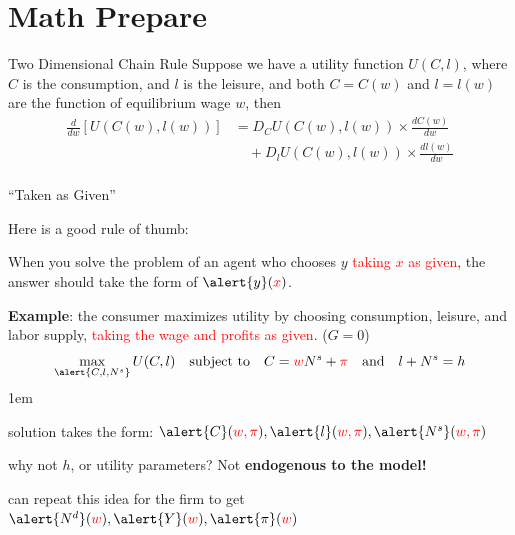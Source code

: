 \documentclass[11pt,aspectratio=43]{beamer}
\newcommand{\red}[1]{\textcolor{red}{#1}}
\let\olditemize=\itemize
\let\endolditemize=\enditemize
\renewenvironment{itemize}{\olditemize \itemsep1em}{\endolditemize}
\theoremstyle{definition}
\begin{document}
\section{Math Prepare}
\label{sec:Math_Prepare}

\begin{frame}{Two Dimensional Chain Rule}
\label{slide:Two_Dimensional_Chain_Rule}
    Suppose we have a utility function $ U( C, l ) $, where $ C $ is the consumption, and $ l $ is the leisure, and both $ C = C( w ) $ and $ l = l( w ) $ are the function of equilibrium wage $ w $, then
    \begin{equation}
    \label{eq:chain_rule}
        \begin{split}
            \frac{d}{dw} [ U( C( w ), l( w ) ) ]
                & = D_{C}U( C( w ), l( w ) ) \times \frac{d C( w )}{d w}
            \\
                & \quad + D_{l} U( C( w ), l( w ) ) \times \frac{d l( w )}{dw}
            \\
        \end{split}
    \end{equation}
\end{frame}

\begin{frame}{``Taken as Given''}
\label{slide:__Taken_as_Given}

Here is a good rule of thumb:
\begin{center}
    When you solve the problem of an agent who \alert{chooses $ y $} \red{taking $ x $ as given}, the answer should take the form of $ \alert{y}( \red{x} ) $.
\end{center}
\textbf{Example}: the consumer maximizes utility by \alert{choosing consumption, leisure, and labor supply}, \red{taking the wage and profits as given}. ($G = 0$)
%
\begin{equation}
\label{eq:taken_as_given}
    \max_{\alert{C, l, N^{s}}} U( C, l ) \quad \text{subject to} \quad C = \red{w} N^{s} + \red{\pi} \quad \text{and} \quad l + N^{s} = h
\end{equation}
%
\begin{itemize}
    \item solution takes the form: $ \alert{C}( \red{w, \pi} ), \alert{l}( \red{w, \pi} ), \alert{N^{s}}( \red{w, \pi} )$
    \item why not $ h $, or utility parameters? Not \textbf{endogenous to the model!}
    \item can repeat this idea for the firm to get $ \alert{N^{d}}( \red{w} ), \alert{Y}( \red{w} ), \alert{\pi}( \red{w} )$
\end{itemize}
\end{frame}
\end{document}
